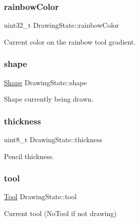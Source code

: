 \subsubsection{\texorpdfstring{rainbow\+Color}{rainbowColor}}
{\footnotesize\ttfamily uint32\+\_\+t Drawing\+State\+::rainbow\+Color}



Current color on the rainbow tool gradient. 

\mbox{\label{group__game__state_ga303447063e848e099650034c763724d7}} 
\subsubsection{\texorpdfstring{shape}{shape}}
{\footnotesize\ttfamily \mbox{\hyperlink{group__canvas_ga55b506070847a13554f8b879c1bfb37c}{Shape}} Drawing\+State\+::shape}



Shape currently being drawn. 

\mbox{\label{group__game__state_ga10ed53265f325368bdc3bea0fd0f7e92}} 
\subsubsection{\texorpdfstring{thickness}{thickness}}
{\footnotesize\ttfamily uint8\+\_\+t Drawing\+State\+::thickness}



Pencil thickness. 

\mbox{\label{group__game__state_ga1e98afd819bebaa1b6bd24c689d870a7}} 
\subsubsection{\texorpdfstring{tool}{tool}}
{\footnotesize\ttfamily \mbox{\hyperlink{group__game__state_ga8cdac3f25ed2be17d210ff50defe0791}{Tool}} Drawing\+State\+::tool}



Current tool (No\+Tool if not drawing) 

